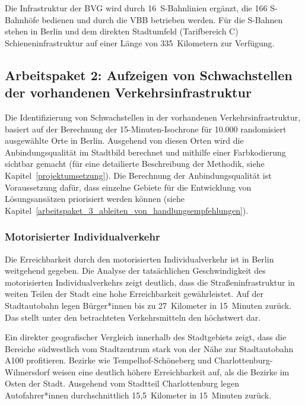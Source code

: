 Die Infrastruktur der BVG wird durch 16~S-Bahnlinien ergänzt, die 166 S-Bahnhöfe bedienen und durch die VBB betrieben werden. Für die S-Bahnen stehen in Berlin und dem direkten Stadtumfeld (Tarifbereich C) Schieneninfrastruktur auf einer Länge von 335~Kilometern zur Verfügung.

\subsection{Arbeitspaket 2: Aufzeigen von Schwachstellen der vorhandenen Verkehrsinfrastruktur}
\label{arbeitspaket_2_aufzeigen_von_schwachstellen_der_vorhandenen_infrastruktur}

Die Identifizierung von Schwachstellen in der vorhandenen Verkehrsinfrastruktur, basiert auf der Berechnung der 15-Minuten-Isochrone für 10.000 randomisiert ausgewählte Orte in Berlin. Ausgehend von diesen Orten wird die Anbindungsqualität im Stadtbild berechnet und mithilfe einer Farbkodierung sichtbar gemacht (für eine detailierte Beschreibung der Methodik, siehe Kapitel~\ref{projektumsetzung}). Die Berechnung der Anbindungsqualität ist Voraussetzung dafür, dass einzelne Gebiete für die Entwicklung von Lösungsansätzen priorisiert werden können (siehe Kapitel~\ref{arbeitspaket_3_ableiten_von_handlungsempfehlungen}).

\subsubsection{Motorisierter Individualverkehr}

Die Erreichbarkeit durch den motorisierten Individualverkehr ist in Berlin weitgehend gegeben. Die Analyse der tatsächlichen Geschwindigkeit des motorisierten Individualverkehrs zeigt deutlich, dass die Straßeninfrastruktur in weiten Teilen der Stadt eine hohe Erreichbarkeit gewährleistet. Auf der Stadtautobahn legen Bürger*innen bis zu 27~Kilometer in 15~Minuten zurück. Das stellt unter den betrachteten Verkehrsmitteln den höchstwert dar.


Ein direkter geografischer Vergleich innerhalb des Stadtgebiets zeigt, dass die Bereiche südwestlich vom Stadtzentrum stark von der Nähe zur Stadtautobahn A100 profitieren. Bezirke wie Tempelhof-Schöneberg und Charlottenburg-Wilmersdorf weisen eine deutlich höhere Erreichbarkeit auf, als die Bezirke im Osten der Stadt. Ausgehend vom Stadtteil Charlottenburg legen Autofahrer*innen durchschnittlich 15,5~Kilometer in 15~Minuten zurück.

